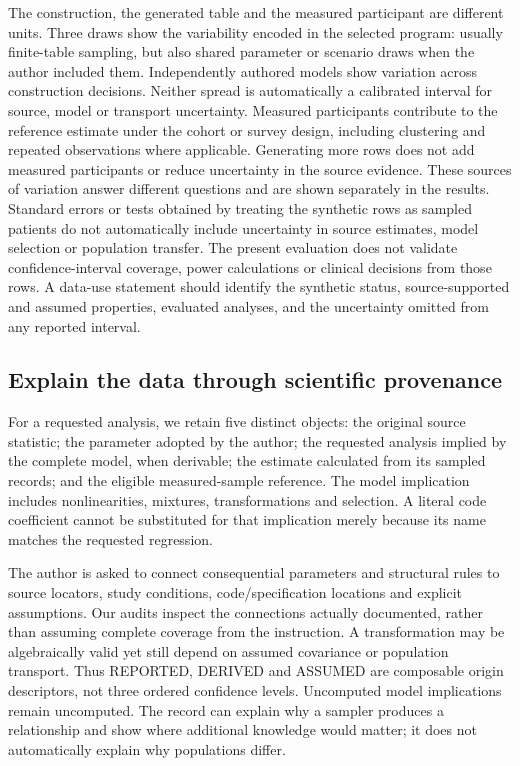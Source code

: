 \documentclass[11pt,letterpaper]{article}
\begin{document}
The construction, the generated table and the measured participant are different units. Three draws show the variability encoded in the selected program: usually finite-table sampling, but also shared parameter or scenario draws when the author included them. Independently authored models show variation across construction decisions. Neither spread is automatically a calibrated interval for source, model or transport uncertainty. Measured participants contribute to the reference estimate under the cohort or survey design, including clustering and repeated observations where applicable. Generating more rows does not add measured participants or reduce uncertainty in the source evidence. These sources of variation answer different questions and are shown separately in the results. Standard errors or tests obtained by treating the synthetic rows as sampled patients do not automatically include uncertainty in source estimates, model selection or population transfer. The present evaluation does not validate confidence-interval coverage, power calculations or clinical decisions from those rows. A data-use statement should identify the synthetic status, source-supported and assumed properties, evaluated analyses, and the uncertainty omitted from any reported interval.


\subsection{Explain the data through scientific provenance}

For a requested analysis, we retain five distinct objects: the original source statistic; the parameter adopted by the author; the requested analysis implied by the complete model, when derivable; the estimate calculated from its sampled records; and the eligible measured-sample reference. The model implication includes nonlinearities, mixtures, transformations and selection. A literal code coefficient cannot be substituted for that implication merely because its name matches the requested regression.


The author is asked to connect consequential parameters and structural rules to source locators, study conditions, code/\allowbreak{}specification locations and explicit assumptions. Our audits inspect the connections actually documented, rather than assuming complete coverage from the instruction. A transformation may be algebraically valid yet still depend on assumed covariance or population transport. Thus REPORTED, DERIVED and ASSUMED are composable origin descriptors, not three ordered confidence levels. Uncomputed model implications remain uncomputed. The record can explain why a sampler produces a relationship and show where additional knowledge would matter; it does not automatically explain why populations differ.
\end{document}
